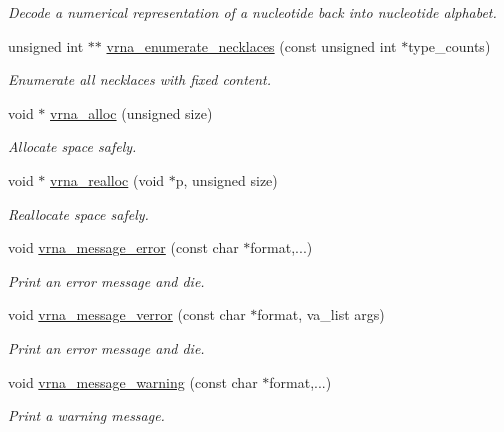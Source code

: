 \begin{DoxyCompactItemize}
\begin{DoxyCompactList}\small\item\em Decode a numerical representation of a nucleotide back into nucleotide alphabet. \end{DoxyCompactList}\item 
unsigned int $\ast$$\ast$ \hyperlink{group__utils_gae081ac655a76bd5c4b3d86c60b096b75}{vrna\+\_\+enumerate\+\_\+necklaces} (const unsigned int $\ast$type\+\_\+counts)
\begin{DoxyCompactList}\small\item\em Enumerate all necklaces with fixed content. \end{DoxyCompactList}\item 
void $\ast$ \hyperlink{group__utils_gaf37a0979367c977edfb9da6614eebe99}{vrna\+\_\+alloc} (unsigned size)
\begin{DoxyCompactList}\small\item\em Allocate space safely. \end{DoxyCompactList}\item 
void $\ast$ \hyperlink{group__utils_ga27f4719a66c6f90d1cca3d1e6e696c6a}{vrna\+\_\+realloc} (void $\ast$p, unsigned size)
\begin{DoxyCompactList}\small\item\em Reallocate space safely. \end{DoxyCompactList}\item 
void \hyperlink{group__utils_ga36b35be01d7f36cf7f59c245eee628d1}{vrna\+\_\+message\+\_\+error} (const char $\ast$format,...)
\begin{DoxyCompactList}\small\item\em Print an error message and die. \end{DoxyCompactList}\item 
void \hyperlink{group__utils_gabc1a08dea0d84b5c33701732172a8b18}{vrna\+\_\+message\+\_\+verror} (const char $\ast$format, va\+\_\+list args)
\begin{DoxyCompactList}\small\item\em Print an error message and die. \end{DoxyCompactList}\item 
void \hyperlink{group__utils_ga6e07ed24add60693ba886d54d0a46635}{vrna\+\_\+message\+\_\+warning} (const char $\ast$format,...)
\begin{DoxyCompactList}\small\item\em Print a warning message. \end{DoxyCompactList}\item 
$$
\end{DoxyCompactItemize}

